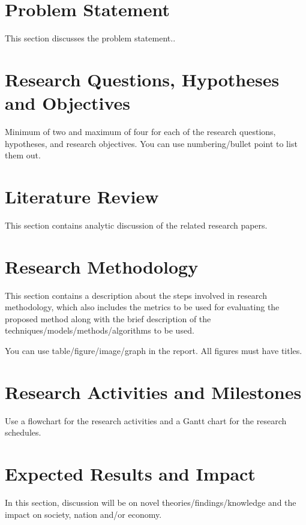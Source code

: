 \documentclass[a4paper, 12pt]{article}
\begin{document}
\section{Problem Statement}
This section discusses the problem statement.. 

\section{Research Questions, Hypotheses and Objectives}
Minimum of two and maximum of four for each of the research questions, hypotheses, and research objectives. You can use numbering/bullet point to list them out.

\section{Literature Review}
This section contains analytic discussion of the related research papers. 

\section{Research Methodology}
This section contains a description about the steps involved in research methodology, which also includes the metrics to be used for evaluating the proposed method along with the brief description of the techniques/models/methods/algorithms to be used.

You can use table/figure/image/graph in the report. All figures must have titles.

\section{Research Activities and Milestones}
Use a flowchart for the research activities and a Gantt chart for the research schedules. 

\section{Expected Results and Impact}
In this section, discussion will be on novel theories/findings/knowledge and the impact on society, nation and/or economy.

\printbibliography
\end{document}
